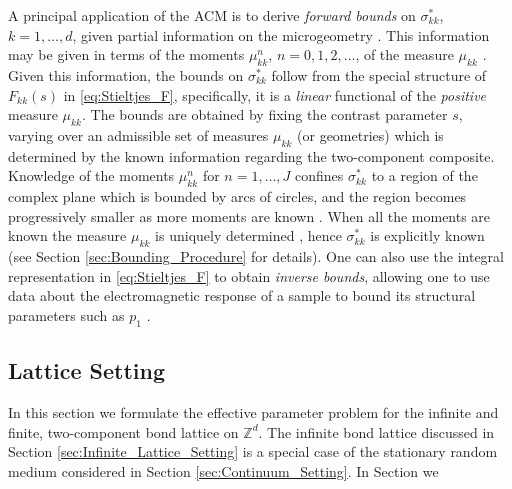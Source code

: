 \documentclass{cmslatex}
\begin{document}
A principal application of the ACM is to derive \emph{forward bounds}
on $\sigma_{kk}^*$, $k=1,\ldots,d$, given partial information on the
microgeometry
\cite{Bergman:PRL-1285,Milton:APL-300,Golden:CMP-473,Bergman:AP-78}. This
information may be given in terms of the moments $\mu_{kk}^n$,
$n=0,1,2,\ldots$, of the measure $\mu_{kk}$
\cite{Milton:JAP-5294,Golden:CMP-473}. Given this information, the
bounds on $\sigma_{kk}^*$ follow from the special structure of $F_{kk}(s)$
in \eqref{eq:Stieltjes_F}, specifically, it is a \emph{linear}
functional of the \emph{positive} measure $\mu_{kk}$.  The bounds are
obtained by fixing the contrast parameter $s$, varying over an
admissible set of measures $\mu_{kk}$ (or geometries) which is
determined by the known information regarding the two-component
composite.  Knowledge of the moments $\mu_{kk}^n$  for $n=1,\ldots,J$ confines
$\sigma_{kk}^*$ to a region of the complex plane which is bounded by arcs
of circles, and the region becomes progressively smaller as more
moments are known \cite{Milton:JAP-5294,Golden:1986:BCP}. When 
all the moments are known the measure $\mu_{kk}$ is uniquely determined 
\cite{Akhiezer:Book:1965}, hence  $\sigma_{kk}^*$ is explicitly known (see
Section \ref{sec:Bounding_Procedure} for details). One can also use
the integral representation in \eqref{eq:Stieltjes_F} to obtain
\emph{inverse bounds}, allowing one to use data about the
electromagnetic response of a sample to bound its structural
parameters such as $p_1$
\cite{Cherkaeva:WRM-437,Cherkaeva:IP-1203,Cherkaeva:IP-065008,Zhang:JCP-5390,Bonifasi-Lista:PMB-3063,Cherkaev:JBiomech-345,Day:JPCM-99,Golden:J_Biomech:337}.     









\subsection{Lattice Setting}
\label{sec:Lattice_Setting}
%
In this section we formulate the effective parameter problem for the
infinite and finite, two-component bond lattice on $\mathbb{Z}^d$. The
infinite bond lattice discussed in Section
\ref{sec:Infinite_Lattice_Setting} is a special case of the stationary
random medium considered in Section \ref{sec:Continuum_Setting}. In
Section we
\end{document}

